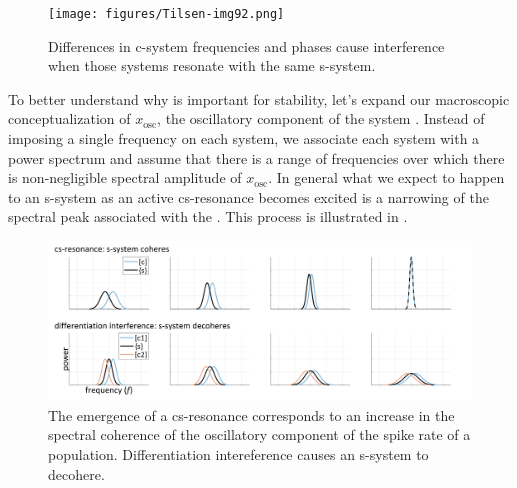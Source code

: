   
\begin{figure}
\texttt{[image: figures/Tilsen-img92.png]}
\caption{Differences in c-system frequencies and phases cause interference when those systems resonate with the same s-system.}
\label{fig:4:42}
\end{figure}
 

  To better understand why  is important for stability, let's expand our macroscopic conceptualization of $x_{\text{osc}}$, the oscillatory component of the system . Instead of imposing a single frequency on each system, we associate each system with a power spectrum and assume that there is a range of frequencies over which there is non-negligible spectral amplitude of $x_{\text{osc}}$. In general what we expect to happen to an s-system as an active cs-resonance becomes excited is a narrowing of the spectral peak associated with the . This process is illustrated in {}.

  
\begin{figure}
\includegraphics[width=\textwidth]{figures/Tilsen-img93.png}
\caption{The emergence of a cs-resonance corresponds to an increase in the spectral coherence of the oscillatory component of the spike rate of a population. Differentiation intereference causes an s-system to decohere.}
\label{fig:4:43}
\end{figure}
 

